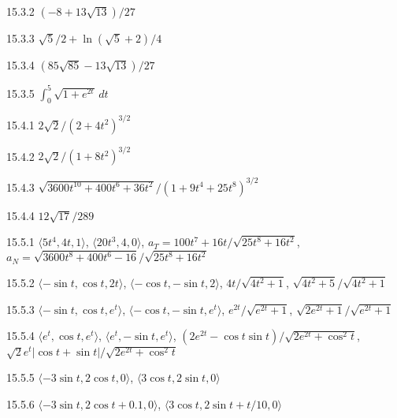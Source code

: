 \begin{Answer}{15.3.2}
	$(-8+13\sqrt{13})/27$
\end{Answer}
\begin{Answer}{15.3.3}
	$\sqrt5/2+\ln(\sqrt5+2)/4$
\end{Answer}
\begin{Answer}{15.3.4}
	$(85\sqrt{85}-13\sqrt{13})/27$
\end{Answer}
\begin{Answer}{15.3.5}
	$\int_0^5 \sqrt{1+e^{2t}}\,dt$
\end{Answer}
\begin{Answer}{15.4.1}
	$2\sqrt2/(2+4t^2)^{3/2}$
\end{Answer}
\begin{Answer}{15.4.2}
	$2\sqrt2/(1+8t^2)^{3/2}$
\end{Answer}
\begin{Answer}{15.4.3}
	$\sqrt{3600t^{10}+400t^6+36t^2}/(1+9t^4+25t^8)^{3/2}$
\end{Answer}
\begin{Answer}{15.4.4}
	$12\sqrt{17}/289$
\end{Answer}
\begin{Answer}{15.5.1}
	$\langle 5t^4, 4t, 1\rangle$,
	$\langle 20t^3, 4,0\rangle$,
	$a_T=100t^7+16t/ \sqrt{25t^8 + 16t^2}$, $a_N=\sqrt{3600t^8 + 400t^6 -16}/ \sqrt{25t^8 + 16t^2}$
\end{Answer}
\begin{Answer}{15.5.2}
	$\langle -\sin t,\cos t,2t\rangle$,
	$\langle -\cos t, -\sin t,2\rangle$,
	$4t/\sqrt{4t^2+1}$, $\sqrt{4t^2+5}/\sqrt{4t^2+1}$
\end{Answer}
\begin{Answer}{15.5.3}
	$\langle -\sin t,\cos t,e^t\rangle$,
	$\langle -\cos t, -\sin t,e^t\rangle$,
	$e^{2t}/\sqrt{e^{2t}+1}$, $\sqrt{2e^{2t}+1}/\sqrt{e^{2t}+1}$
\end{Answer}
\begin{Answer}{15.5.4}
	$\langle e^t,\cos t,e^t\rangle$,
	$\langle e^t, -\sin t,e^t\rangle$,
	$(2e^{2t}-\cos t\sin t)/\sqrt{2e^{2t}+\cos^2 t}$,
	$\sqrt{2}e^t|\cos t+\sin t|/\sqrt{2e^{2t}+\cos^2 t}$
\end{Answer}
\begin{Answer}{15.5.5}
	$\langle -3\sin t,2\cos t,0\rangle$,
	$\langle 3\cos t, 2\sin t,0\rangle$
\end{Answer}
\begin{Answer}{15.5.6}
	$\langle -3\sin t,2\cos t+0.1,0\rangle$,
	$\langle 3\cos t, 2\sin t+t/10,0\rangle$
\end{Answer}
